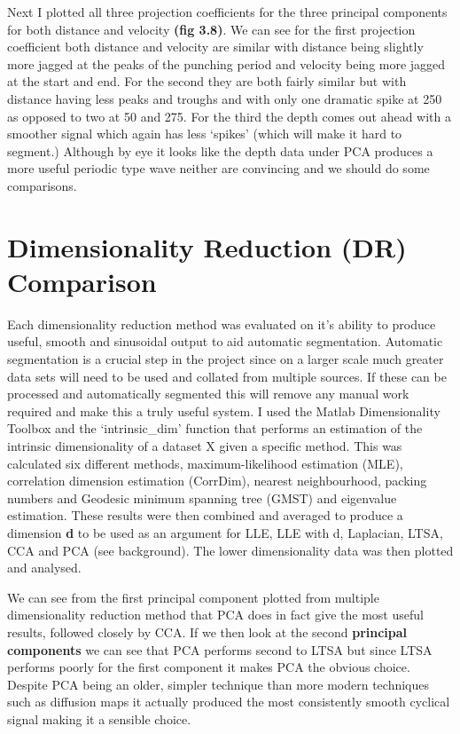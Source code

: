 Next I plotted all three projection coefficients for the three principal components for both distance and velocity {\bf(fig 3.8)}. We can see for the first projection coefficient both distance and velocity are similar with distance being slightly more jagged at the peaks of the punching period and velocity being more jagged at the start and end.
For the second they are both fairly similar but with distance having less peaks and troughs and with only one dramatic spike at 250 as opposed to two at 50 and 275.
For the third the depth comes out ahead with a smoother signal which again has less `spikes' (which will make it hard to segment.) Although by eye it looks like the depth data under PCA produces a more useful periodic type wave neither are convincing and we should do some comparisons.\clearpage

\section {Dimensionality Reduction (DR) Comparison}
Each dimensionality reduction method was evaluated on it's ability to produce useful, smooth and sinusoidal output to aid automatic segmentation. Automatic segmentation is a crucial step in the project since on a larger scale much greater data sets will need to be used and collated from multiple sources. If these can be processed and automatically segmented this will remove any manual work required and make this a truly useful system. I used the Matlab Dimensionality Toolbox and the `intrinsic_dim' function that performs an estimation of the intrinsic dimensionality of a dataset X given a specific method. This was calculated six different methods, maximum-likelihood estimation (MLE), correlation dimension estimation (CorrDim), nearest neighbourhood, packing numbers and Geodesic minimum spanning tree (GMST) and eigenvalue estimation.
These results were then combined and averaged to produce a dimension {\bf d} to be used as an argument for LLE, LLE with d, Laplacian, LTSA, CCA and PCA (see background). The lower dimensionality data was then plotted and analysed.

We can see from the first principal component plotted from multiple dimensionality reduction method that PCA does in fact give the most useful results, followed closely by CCA. If we then look at the second {\bf principal components} we can see that PCA performs second to LTSA but since LTSA performs poorly for the first component it makes PCA the obvious choice. Despite PCA being an older, simpler technique than more modern techniques such as diffusion maps it actually produced the most consistently smooth cyclical signal making it a sensible choice.
\vspace{2.0cm}

